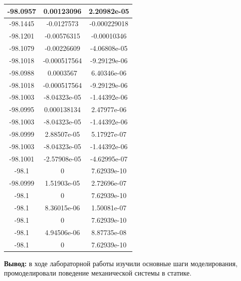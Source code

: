 \documentclass[a4paper,14pt]{extarticle}
\begin{document}
\begin{enumerate}[1. ]
\begin{center}
\begin{tabular}{|c|c|c|}
                  \hline
                  -98.0957 & 0.00123096   & 2.20982e-05  \\
                  \hline
                  -98.1445 & -0.0127573   & -0.000229018 \\
                  \hline
                  -98.1201 & -0.00576315  & -0.00010346  \\
                  \hline
                  -98.1079 & -0.00226609  & -4.06808e-05 \\
                  \hline
                  -98.1018 & -0.000517564 & -9.29129e-06 \\
                  \hline
                  -98.0988 & 0.0003567    & 6.40346e-06  \\
                  \hline
                  -98.1018 & -0.000517564 & -9.29129e-06 \\
                  \hline
                  -98.1003 & -8.04323e-05 & -1.44392e-06 \\
                  \hline
                  -98.0995 & 0.000138134  & 2.47977e-06  \\
                  \hline
                  -98.1003 & -8.04323e-05 & -1.44392e-06 \\
                  \hline
                  -98.0999 & 2.88507e-05  & 5.17927e-07  \\
                  \hline
                  -98.1003 & -8.04323e-05 & -1.44392e-06 \\
                  \hline
                  -98.1001 & -2.57908e-05 & -4.62995e-07 \\
                  \hline
                  -98.1    & 0            & 7.62939e-10  \\
                  \hline
                  -98.0999 & 1.51903e-05  & 2.72696e-07  \\
                  \hline
                  -98.1    & 0            & 7.62939e-10  \\
                  \hline
                  -98.1    & 8.36015e-06  & 1.50081e-07  \\
                  \hline
                  -98.1    & 0            & 7.62939e-10  \\
                  \hline
                  -98.1    & 4.94506e-06  & 8.87735e-08  \\
                  \hline
                  \rowcolor{Yellow}
                  -98.1    & 0            & 7.62939e-10  \\
                  \hline
              \end{tabular}
          \end{center}

\end{enumerate}

\textbf{Вывод: } в ходе лабораторной работы изучили основные шаги моделирования, 
промоделировали поведение механической системы в статике.
\end{document}

